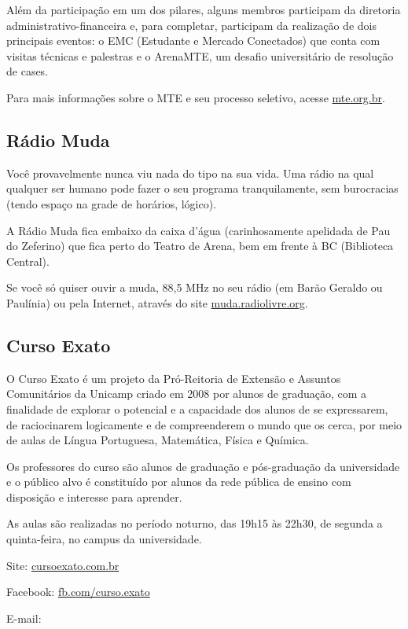 Além da participação em um dos pilares, alguns membros participam da diretoria
administrativo-financeira e, para completar, participam da realização de dois
principais eventos: o EMC (Estudante e Mercado Conectados) que conta com visitas
técnicas e palestras e o ArenaMTE, um desafio universitário de resolução de
cases.

Para mais informações sobre o MTE e seu processo seletivo, acesse
\url{mte.org.br}.

\subsection{Rádio Muda}

Você provavelmente nunca viu nada do tipo na sua vida. Uma rádio na qual
qualquer ser humano pode fazer o seu programa tranquilamente, sem burocracias
(tendo espaço na grade de horários, lógico).

A Rádio Muda fica embaixo da caixa d'água (carinhosamente apelidada de Pau do
Zeferino) que fica perto do Teatro de Arena, bem em frente à BC (Biblioteca
Central).

Se você só quiser ouvir a muda, 88,5 MHz no seu rádio (em Barão Geraldo ou
Paulínia) ou pela Internet, através do site \url{muda.radiolivre.org}.

\subsection{Curso Exato}

O Curso Exato é um projeto da Pró-Reitoria de Extensão e Assuntos Comunitários
da Unicamp criado em 2008 por alunos de graduação, com a finalidade de explorar
o potencial e a capacidade dos alunos de se expressarem, de raciocinarem
logicamente e de compreenderem o mundo que os cerca, por meio de aulas de Língua
Portuguesa, Matemática, Física e Química.

Os professores do curso são alunos de graduação e pós-graduação da universidade
e o público alvo é constituído por alunos da rede pública de ensino com
disposição e interesse para aprender.

As aulas são realizadas no período noturno, das 19h15 às 22h30, de segunda a
quinta-feira, no campus da universidade.

\begin{compactitemize}
    \item Site: \url{cursoexato.com.br}
    \item Facebook: \url{fb.com/curso.exato}
    \item E-mail: 
\end{compactitemize}

